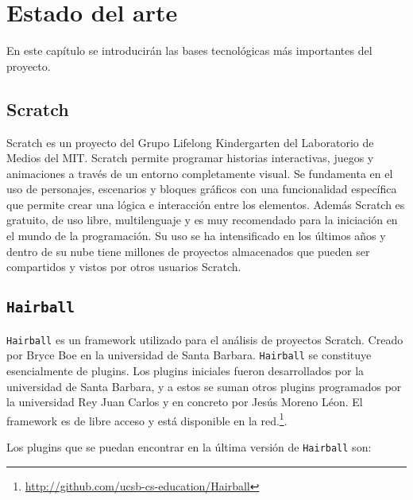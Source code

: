 \documentclass[a4paper, 12pt]{book}
\begin{document}
\cleardoublepage
\chapter{Estado del arte}

En este capítulo se introducirán las bases tecnológicas más importantes del proyecto.


\section{Scratch}
\label{sec:seccion2}
Scratch es un proyecto del Grupo Lifelong Kindergarten del Laboratorio de Medios del MIT.
Scratch permite programar historias interactivas, juegos y animaciones a través de un
entorno completamente visual. Se fundamenta en el uso de personajes, escenarios y bloques
gráficos con una funcionalidad específica que permite crear una lógica e interacción
entre los elementos. Además Scratch es gratuito, de uso libre, multilenguaje y es muy
recomendado para la iniciación en el mundo de la programación. Su uso se ha intensificado
en los últimos años y dentro de su nube tiene millones de proyectos almacenados que
pueden ser compartidos y vistos por otros usuarios Scratch.


\section{\texttt{Hairball}}
\label{sec:seccion3}
\texttt{Hairball} es un framework utilizado para el análisis de proyectos Scratch. Creado por Bryce
Boe en la universidad de Santa Barbara. \texttt{Hairball} se constituye esencialmente de plugins.
Los plugins iniciales fueron desarrollados por la universidad de Santa Barbara, y a estos se
suman otros plugins programados por la universidad Rey Juan Carlos y en concreto por Jesús Moreno Léon.
El framework es de libre acceso y está disponible en la red.\footnote{\url{http://github.com/ucsb-cs-education/Hairball}}.

Los plugins que se puedan encontrar en la última versión de \texttt{Hairball} son:
\end{document}
